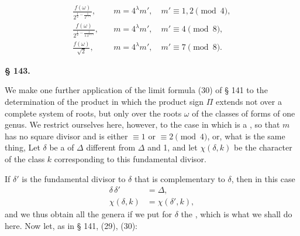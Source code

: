 
\[
\begin{aligned}
\frac{f(\omega)}{2^{\frac{1}{2} - \frac{1}{2^{\lambda+2}}}}, & \quad m = 4^\lambda m', \quad m' \equiv 1, 2 \pmod 4, \\
\frac{f(\omega)}{2^{\frac{1}{2} - \frac{1}{3.\,2^{\lambda+1}}}}, & \quad m = 4^\lambda m', \quad m' \equiv 4 \pmod 8, \\
\frac{f(\omega)}{\sqrt{2}}, & \quad m = 4^\lambda m', \quad m' \equiv 7 \pmod 8.
\end{aligned}
\]

\begin{center}
\textbf{§ 143.\quad {}}
\end{center}

We make one further application of the limit formula (30) of § 141 to the
determination of the product
in which the product sign $\Pi$ extends not over a complete system of
roots, but only over the roots $\omega$ of the classes of forms of one
genus. We restrict ourselves here, however, to the case in which
is a , so that $m$ has no square
divisor and is either $\equiv 1$ or $\equiv 2 \pmod 4$, or, what is the
same thing,
Let $\delta$ be a  of $\Delta$ different from
$\Delta$ and 1, and let $\chi(\delta, k)$ be the character of the class $k$
corresponding to this fundamental divisor.

If $\delta'$ is the fundamental divisor to $\delta$ that is complementary
to $\delta$, then in this case
\[
\begin{aligned}
\delta\,\delta' &= \Delta, \\
\chi(\delta, k) &= \chi(\delta', k),
\end{aligned}
\]
and we thus obtain all the genera if we put for $\delta$ the , which is what we shall do here. Now let, as in
§ 141, (29), (30):
